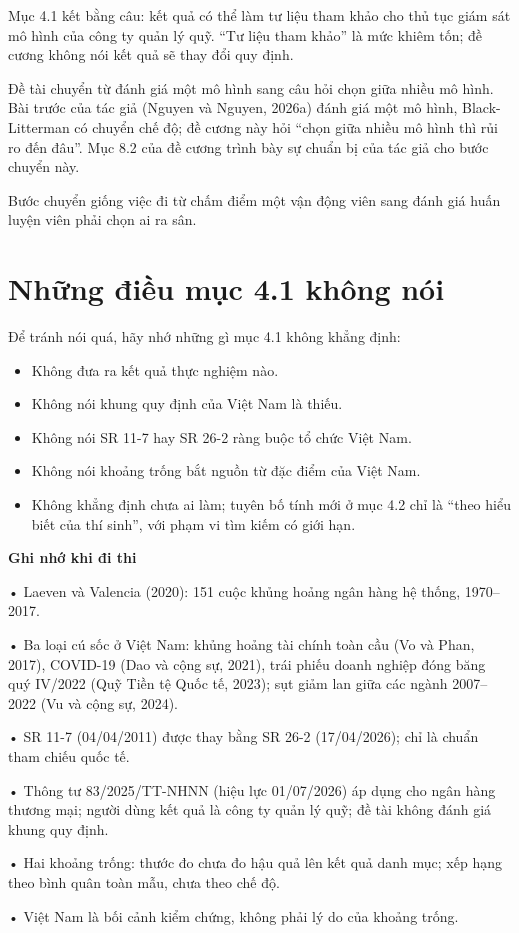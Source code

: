 Mục 4.1 kết bằng câu: kết quả có thể làm tư liệu tham khảo cho thủ tục giám sát mô hình của công ty quản lý quỹ. “Tư liệu tham khảo” là mức khiêm tốn; đề cương không nói kết quả sẽ thay đổi quy định.

Đề tài chuyển từ đánh giá một mô hình sang câu hỏi chọn giữa nhiều mô hình. Bài trước của tác giả (Nguyen và Nguyen, 2026a) đánh giá một mô hình, Black-Litterman có chuyển chế độ; đề cương này hỏi “chọn giữa nhiều mô hình thì rủi ro đến đâu”. Mục 8.2 của đề cương trình bày sự chuẩn bị của tác giả cho bước chuyển này.

Bước chuyển giống việc đi từ chấm điểm một vận động viên sang đánh giá huấn luyện viên phải chọn ai ra sân.

\section{Những điều mục 4.1 không nói}

Để tránh nói quá, hãy nhớ những gì mục 4.1 không khẳng định:

\begin{itemize}
\item
  Không đưa ra kết quả thực nghiệm nào.
\item
  Không nói khung quy định của Việt Nam là thiếu.
\item
  Không nói SR 11-7 hay SR 26-2 ràng buộc tổ chức Việt Nam.
\item
  Không nói khoảng trống bắt nguồn từ đặc điểm của Việt Nam.
\item
  Không khẳng định chưa ai làm; tuyên bố tính mới ở mục 4.2 chỉ là “theo hiểu biết của thí sinh”, với phạm vi tìm kiếm có giới hạn.
\end{itemize}

\begin{tcolorbox}[breakable]
\textbf{Ghi nhớ khi đi thi}

• Laeven và Valencia (2020): 151 cuộc khủng hoảng ngân hàng hệ thống, 1970--2017.

• Ba loại cú sốc ở Việt Nam: khủng hoảng tài chính toàn cầu (Vo và Phan, 2017), COVID-19 (Dao và cộng sự, 2021), trái phiếu doanh nghiệp đóng băng quý IV/2022 (Quỹ Tiền tệ Quốc tế, 2023); sụt giảm lan giữa các ngành 2007--2022 (Vu và cộng sự, 2024).

• SR 11-7 (04/04/2011) được thay bằng SR 26-2 (17/04/2026); chỉ là chuẩn tham chiếu quốc tế.

• Thông tư 83/2025/TT-NHNN (hiệu lực 01/07/2026) áp dụng cho ngân hàng thương mại; người dùng kết quả là công ty quản lý quỹ; đề tài không đánh giá khung quy định.

• Hai khoảng trống: thước đo chưa đo hậu quả lên kết quả danh mục; xếp hạng theo bình quân toàn mẫu, chưa theo chế độ.

• Việt Nam là bối cảnh kiểm chứng, không phải lý do của khoảng trống.
\end{tcolorbox}

